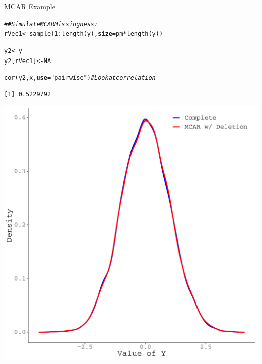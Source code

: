 \documentclass{beamer}\usepackage[]{graphicx}\usepackage[]{color}
\makeatletter
\newcommand{\hlnum}[1]{\textcolor[rgb]{0.69,0.494,0}{#1}}%
\newcommand{\hlstr}[1]{\textcolor[rgb]{0.749,0.012,0.012}{#1}}%
\newcommand{\hlcom}[1]{\textcolor[rgb]{0.514,0.506,0.514}{\textit{#1}}}%
\newcommand{\hlopt}[1]{\textcolor[rgb]{0,0,0}{#1}}%
\newcommand{\hlstd}[1]{\textcolor[rgb]{0,0,0}{#1}}%
\newcommand{\hlkwb}[1]{\textcolor[rgb]{0,0.341,0.682}{#1}}%
\newcommand{\hlkwc}[1]{\textcolor[rgb]{0,0,0}{\textbf{#1}}}%
\newcommand{\hlkwd}[1]{\textcolor[rgb]{0.004,0.004,0.506}{#1}}%
\newenvironment{kframe}{%
 \def\at@end@of@kframe{}%
 \ifinner\ifhmode%
  \def\at@end@of@kframe{\end{minipage}}%
  \begin{minipage}{\columnwidth}%
 \fi\fi%
 \def\FrameCommand##1{\hskip\@totalleftmargin \hskip-\fboxsep
 \colorbox{shadecolor}{##1}\hskip-\fboxsep
     \hskip-\linewidth \hskip-\@totalleftmargin \hskip\columnwidth}%
 \MakeFramed {\advance\hsize-\width
   \@totalleftmargin\z@ \linewidth\hsize
   \@setminipage}}%
 {\par\unskip\endMakeFramed%
 \at@end@of@kframe}
\newenvironment{knitrout}{}{} %
\makeatother
\begin{document}

\begin{frame}{MCAR Example}
  
\begin{knitrout}\footnotesize
{}\color{fgcolor}\begin{kframe}
\begin{alltt}
\hlcom{## Simulate MCAR Missingness:}
\hlstd{rVec1} \hlkwb{<-} \hlkwd{sample}\hlstd{(}\hlnum{1} \hlopt{:} \hlkwd{length}\hlstd{(y),} \hlkwc{size} \hlstd{= pm} \hlopt{*} \hlkwd{length}\hlstd{(y))}

\hlstd{y2} \hlkwb{<-} \hlstd{y}
\hlstd{y2[rVec1]} \hlkwb{<-} \hlnum{NA}

\hlkwd{cor}\hlstd{(y2, x,} \hlkwc{use} \hlstd{=} \hlstr{"pairwise"}\hlstd{)} \hlcom{# Look at correlation}
\end{alltt}
\begin{verbatim}
[1] 0.5229792
\end{verbatim}
\end{kframe}
\end{knitrout}

\pagebreak

\begin{knitrout}\footnotesize
{}\color{fgcolor}

{\centering \includegraphics[width=0.65\linewidth]{figure/intro-unnamed-chunk-12-1} 

}


\end{knitrout}

\end{frame}
\end{document}
